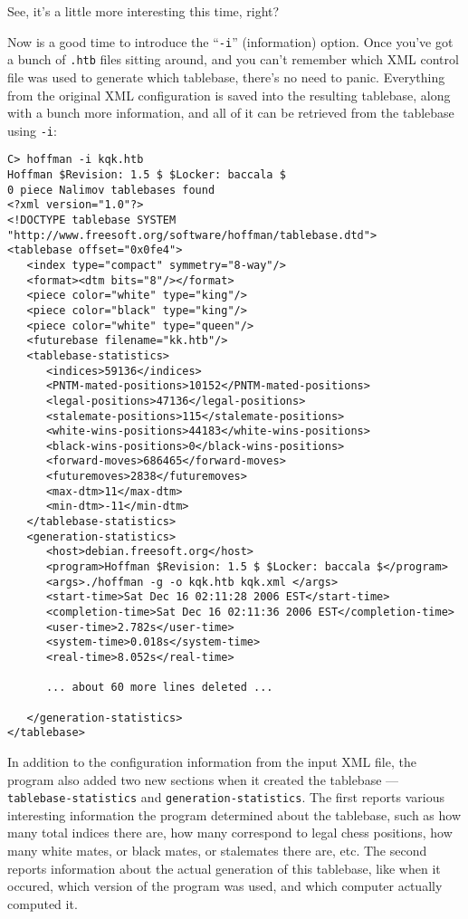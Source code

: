 \documentclass[11pt]{article}
\begin{document}
See, it's a little more interesting this time, right?

Now is a good time to introduce the ``{\tt -i}'' (information) option.
Once you've got a bunch of {\tt .htb} files sitting around, and you
can't remember which XML control file was used to generate which
tablebase, there's no need to panic.  Everything from the original XML
configuration is saved into the resulting tablebase, along with a
bunch more information, and all of it can be retrieved from the
tablebase using {\tt -i}:

{\small\begin{verbatim}
C> hoffman -i kqk.htb
Hoffman $Revision: 1.5 $ $Locker: baccala $
0 piece Nalimov tablebases found
<?xml version="1.0"?>
<!DOCTYPE tablebase SYSTEM "http://www.freesoft.org/software/hoffman/tablebase.dtd">
<tablebase offset="0x0fe4">
   <index type="compact" symmetry="8-way"/>
   <format><dtm bits="8"/></format>
   <piece color="white" type="king"/>
   <piece color="black" type="king"/>
   <piece color="white" type="queen"/>
   <futurebase filename="kk.htb"/>
   <tablebase-statistics>
      <indices>59136</indices>
      <PNTM-mated-positions>10152</PNTM-mated-positions>
      <legal-positions>47136</legal-positions>
      <stalemate-positions>115</stalemate-positions>
      <white-wins-positions>44183</white-wins-positions>
      <black-wins-positions>0</black-wins-positions>
      <forward-moves>686465</forward-moves>
      <futuremoves>2838</futuremoves>
      <max-dtm>11</max-dtm>
      <min-dtm>-11</min-dtm>
   </tablebase-statistics>
   <generation-statistics>
      <host>debian.freesoft.org</host>
      <program>Hoffman $Revision: 1.5 $ $Locker: baccala $</program>
      <args>./hoffman -g -o kqk.htb kqk.xml </args>
      <start-time>Sat Dec 16 02:11:28 2006 EST</start-time>
      <completion-time>Sat Dec 16 02:11:36 2006 EST</completion-time>
      <user-time>2.782s</user-time>
      <system-time>0.018s</system-time>
      <real-time>8.052s</real-time>

      ... about 60 more lines deleted ...

   </generation-statistics>
</tablebase>
\end{verbatim}}

In addition to the configuration information from the input XML file,
the program also added two new sections when it created the tablebase
--- {\tt tablebase-statistics} and {\tt generation-statistics}.  The
first reports various interesting information the program determined
about the tablebase, such as how many total indices there are, how
many correspond to legal chess positions, how many white mates, or
black mates, or stalemates there are, etc.  The second reports
information about the actual generation of this tablebase, like when
it occured, which version of the program was used, and which computer
actually computed it.
\end{document}

